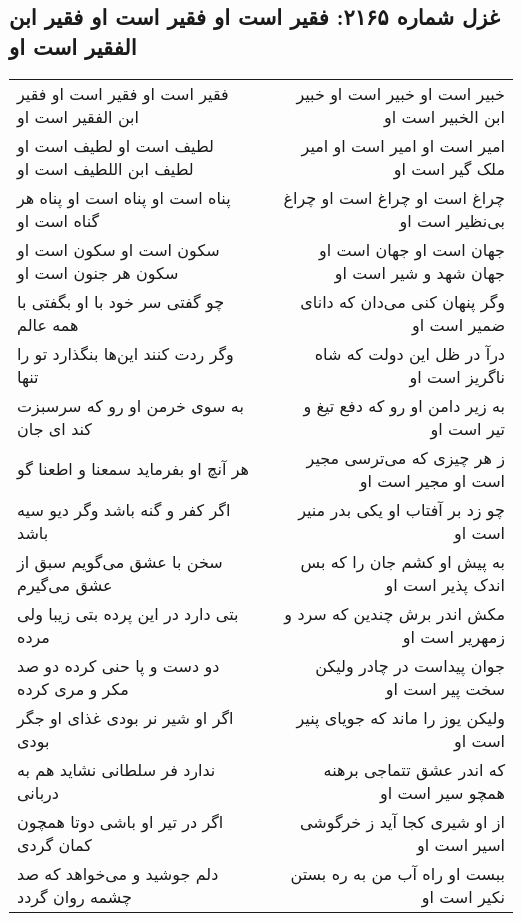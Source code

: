 \begin{center}
\section*{غزل شماره ۲۱۶۵: فقیر است او فقیر است او فقیر ابن الفقیر است او}
\label{sec:2165}
\begin{longtable}{l p{0.5cm} r}
فقیر است او فقیر است او فقیر ابن الفقیر است او
&&
خبیر است او خبیر است او خبیر ابن الخبیر است او
\\
لطیف است او لطیف است او لطیف ابن اللطیف است او
&&
امیر است او امیر است او امیر ملک گیر است او
\\
پناه است او پناه است او پناه هر گناه است او
&&
چراغ است او چراغ است او چراغ بی‌نظیر است او
\\
سکون است او سکون است او سکون هر جنون است او
&&
جهان است او جهان است او جهان شهد و شیر است او
\\
چو گفتی سر خود با او بگفتی با همه عالم
&&
وگر پنهان کنی می‌دان که دانای ضمیر است او
\\
وگر ردت کنند این‌ها بنگذارد تو را تنها
&&
درآ در ظل این دولت که شاه ناگریز است او
\\
به سوی خرمن او رو که سرسبزت کند ای جان
&&
به زیر دامن او رو که دفع تیغ و تیر است او
\\
هر آنچ او بفرماید سمعنا و اطعنا گو
&&
ز هر چیزی که می‌ترسی مجیر است او مجیر است او
\\
اگر کفر و گنه باشد وگر دیو سیه باشد
&&
چو زد بر آفتاب او یکی بدر منیر است او
\\
سخن با عشق می‌گویم سبق از عشق می‌گیرم
&&
به پیش او کشم جان را که بس اندک پذیر است او
\\
بتی دارد در این پرده بتی زیبا ولی مرده
&&
مکش اندر برش چندین که سرد و زمهریر است او
\\
دو دست و پا حنی کرده دو صد مکر و مری کرده
&&
جوان پیداست در چادر ولیکن سخت پیر است او
\\
اگر او شیر نر بودی غذای او جگر بودی
&&
ولیکن یوز را ماند که جویای پنیر است او
\\
ندارد فر سلطانی نشاید هم به دربانی
&&
که اندر عشق تتماجی برهنه همچو سیر است او
\\
اگر در تیر او باشی دوتا همچون کمان گردی
&&
از او شیری کجا آید ز خرگوشی اسیر است او
\\
دلم جوشید و می‌خواهد که صد چشمه روان گردد
&&
ببست او راه آب من به ره بستن نکیر است او
\\
\end{longtable}
\end{center}

